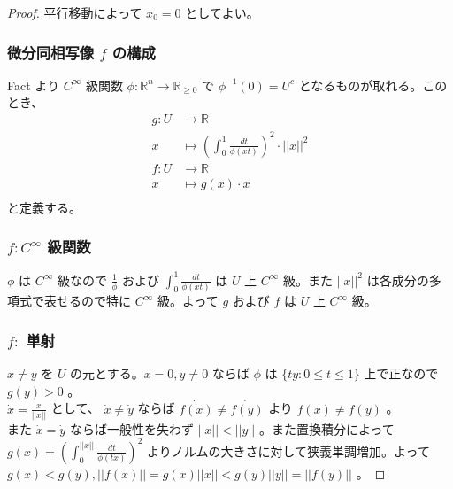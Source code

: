 \documentclass[a4paper,10pt]{jsarticle}
\begin{document}
\begin{proof}
  平行移動によって $x_0=0$ としてよい。

  \subsubsection*{微分同相写像 $f$ の構成}
  Fact より $C^\infty$ 級関数 $\phi:\mathbb{R}^n \to \mathbb{R}_{\geq 0}$ で $\phi^{-1}(0)=U^c$ となるものが取れる。このとき、
  \begin{align*}
    g:U &\to \mathbb{R} \\
    x &\mapsto (\int_{0}^1 \frac{dt}{\phi(xt)})^2 \cdot ||x||^2 \\
    f:U &\to \mathbb{R} \\
    x &\mapsto g(x)\cdot x \\
  \end{align*}
  と定義する。 

  \subsubsection*{$f:C^\infty$ 級関数}
  $\phi$ は $C^\infty$ 級なので $\frac{1}{\phi}$ および $\int_{0}^1 \frac{dt}{\phi(xt)}$ は $U$ 上 $C^\infty$ 級。また $||x||^2$ は各成分の多項式で表せるので特に $C^\infty$ 級。よって $g$ および $f$ は $U$ 上 $C^\infty$ 級。
  
  \subsubsection*{$f:$ 単射}
  $x \neq y$ を $U$ の元とする。$x=0,y \neq 0$ ならば $\phi$ は $\{ty:0 \leq t \leq 1\}$ 上で正なので $g(y)>0$ 。 \\
  $\dot{x}=\frac{x}{||x||}$ として、 $\dot{x} \neq \dot{y}$ ならば $\dot{f(x)} \neq \dot{f(y)}$ より $f(x) \neq f(y)$ 。 \\
  また $\dot{x}=\dot{y}$ ならば一般性を失わず $||x||<||y||$ 。また置換積分によって $g(x)=(\int_{0}^{||x||} \frac{dt}{\phi(t\dot{x})})^2$ よりノルムの大きさに対して狭義単調増加。よって $g(x)<g(y),||f(x)||=g(x)||x||<g(y)||y||=||f(y)||$ 。
  

\end{proof}
\end{document}
